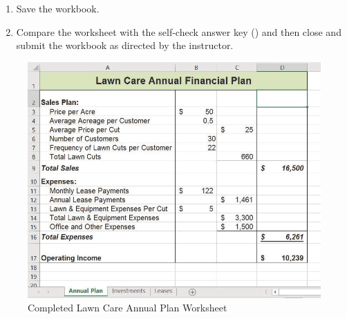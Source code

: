 \begin{enumbox}
\begin{enumerate}
		\begin{enumerate}
			\item On the  sheet, apply Accounting format with $ 0 $ decimals to ,  , and . Apply Comma format with $ 0 $ decimals to the ranges  and . 
	
			\item On the  worksheet, apply Accounting format with two decimals to the range  and . Apply Comma format with two decimals to the range . 
		\end{enumerate}
		
		Double check that the formatting matches Figures \ref{02:fig47}, \ref{02:fig48}, and \ref{02:fig49}.
		\item Save the  workbook.
		\item Compare the worksheet with the self-check answer key () and then close and submit the  workbook as directed by the instructor.
	
	\end{enumerate}
\end{enumbox}

\begin{figure}[H]
	\centering
	\includegraphics[width=\maxwidth{.95\linewidth}]{gfx/ch02_fig47}
	\caption{Completed Lawn Care Annual Plan Worksheet}
	\label{02:fig47}
\end{figure}

